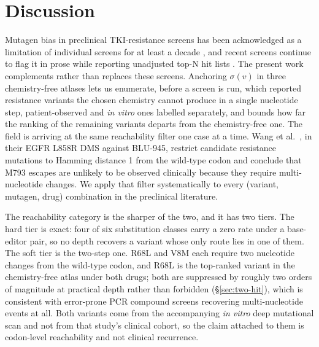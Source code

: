 \documentclass[11pt,a4paper]{article}
\begin{document}
\section{Discussion}

Mutagen bias in preclinical TKI-resistance screens has been acknowledged
as a limitation of individual screens for at least a decade
\citep{bradeen2006,doi2022}, and recent screens continue to flag it in
prose while reporting unadjusted top-N hit lists
\citep{tangpeerachaikul2025,takei2025}. The present work complements
rather than replaces these screens. Anchoring $\sigma(v)$ in three
chemistry-free atlases lets us enumerate, before a screen is run, which
reported resistance variants the chosen chemistry cannot produce in a
single nucleotide step, patient-observed and \textit{in vitro} ones
labelled separately, and bounds how far the ranking of the remaining
variants departs from the chemistry-free one. The field is
arriving at the same reachability filter one case at a time. Wang et
al.\ \citep{wang2025}, in their EGFR L858R DMS against BLU-945, restrict
candidate resistance mutations to Hamming distance 1 from the wild-type
codon and conclude that M793 escapes are unlikely to be observed
clinically because they require multi-nucleotide changes. We apply that
filter systematically to every (variant, mutagen, drug) combination in
the preclinical literature.

The reachability category is the sharper of the two, and it has two
tiers. The hard tier is exact: four of six substitution classes carry
a zero rate under a base-editor pair, so no depth recovers a variant
whose only route lies in one of them. The soft tier is the two-step
one. R68L and V8M each require two nucleotide changes from the
wild-type codon, and R68L is the top-ranked variant in the
chemistry-free atlas under both drugs; both are suppressed by roughly
two orders of magnitude at practical depth rather than forbidden
(\S\ref{sec:two-hit}), which is consistent with error-prone PCR
compound screens recovering multi-nucleotide events at all. Both
variants come from the accompanying \textit{in vitro} deep mutational
scan \citep{awad2021} and not from that study's clinical cohort, so
the claim attached to them is codon-level reachability and not
clinical recurrence.
\end{document}
